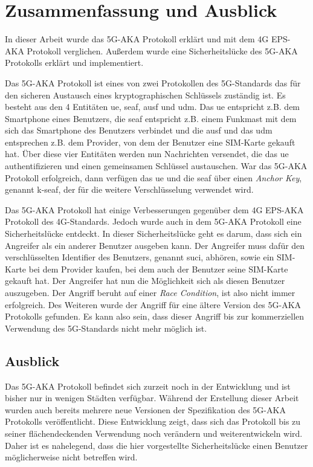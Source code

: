 \chapter{Zusammenfassung und Ausblick}
\label{chap:6}

In dieser Arbeit wurde das 5G-AKA Protokoll erklärt und mit dem 4G EPS-AKA Protokoll verglichen.
Außerdem wurde eine Sicherheitslücke des 5G-AKA Protokolls erklärt und implementiert.

Das 5G-AKA Protokoll ist eines von zwei Protokollen des 5G-Standards das für den sicheren Austausch eines kryptographischen Schlüssels zuständig ist.
Es besteht aus den 4 Entitäten \gls{ue}, \gls{seaf}, \gls{ausf} und \gls{udm}.
Das \gls{ue} entspricht z.B. dem Smartphone eines Benutzers, die \gls{seaf} entspricht z.B. einem Funkmast mit dem sich das Smartphone des Benutzers verbindet und die \gls{ausf} und das \gls{udm} entsprechen z.B. dem Provider, von dem der Benutzer eine SIM-Karte gekauft hat.
Über diese vier Entitäten werden nun Nachrichten versendet, die das \gls{ue} authentifizieren und einen gemeinsamen Schlüssel austauschen.
War das 5G-AKA Protokoll erfolgreich, dann verfügen das \gls{ue} und die \gls{seaf} über einen \textit{Anchor Key}, genannt \gls{k-seaf}, der für die weitere Verschlüsselung verwendet wird.

Das 5G-AKA Protokoll hat einige Verbesserungen gegenüber dem 4G EPS-AKA Protokoll des 4G-Standards.
Jedoch wurde auch in dem 5G-AKA Protokoll eine Sicherheitslücke entdeckt.
In dieser Sicherheitslücke geht es darum, dass sich ein Angreifer als ein anderer Benutzer ausgeben kann.
Der Angreifer muss dafür den verschlüsselten Identifier des Benutzers, genannt \gls{suci}, abhören, sowie ein SIM-Karte bei dem Provider kaufen, bei dem auch der Benutzer seine SIM-Karte gekauft hat.
Der Angreifer hat nun die Möglichkeit sich als diesen Benutzer auszugeben.
Der Angriff beruht auf einer \textit{Race Condition}, ist also nicht immer erfolgreich.
Des Weiteren wurde der Angriff für eine ältere Version des 5G-AKA Protokolls gefunden.
Es kann also sein, dass dieser Angriff bis zur kommerziellen Verwendung des 5G-Standards nicht mehr möglich ist.


\section*{Ausblick}
Das 5G-AKA Protokoll befindet sich zurzeit noch in der Entwicklung und ist bisher nur in wenigen Städten verfügbar.
Während der Erstellung dieser Arbeit wurden auch bereits mehrere neue Versionen der Spezifikation des 5G-AKA Protokolls veröffentlicht.
Diese Entwicklung zeigt, dass sich das Protokoll bis zu seiner flächendeckenden Verwendung noch verändern und weiterentwickeln wird.
Daher ist es nahelegend, dass die hier vorgestellte Sicherheitslücke einen Benutzer möglicherweise nicht betreffen wird.
